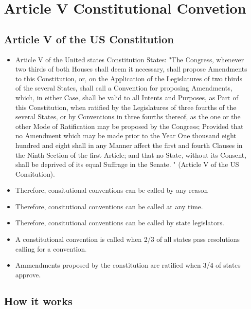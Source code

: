 \documentclass[11pt]{article} %
\begin{document}
\section{Article V Constitutional Convetion}

\subsection{Article V of the US Constitution}

\begin{itemize}

\item Article V of the United states Constitution States: "The Congress, whenever two thirds of both Houses shall deem it necessary, shall propose Amendments to this Constitution, or, on the Application of the Legislatures of two thirds of the several States, shall call a Convention for proposing Amendments, which, in either Case, shall be valid to all Intents and Purposes, as Part of this Constitution, when ratified by the Legislatures of three fourths of the several States, or by Conventions in three fourths thereof, as the one or the other Mode of Ratification may be proposed by the Congress; Provided that no Amendment which may be made prior to the Year One thousand eight hundred and eight shall in any Manner affect the first and fourth Clauses in the Ninth Section of the first Article; and that no State, without its Consent, shall be deprived of its equal Suffrage in the Senate. " (Article V of the US Consitution).

\item Therefore, consitutional conventions can be called by any reason

\item Therefore, consitutional conventions can be called at any time.

\item Therefore, consitutional conventions can be called by state legislators.

\item A constitutional convention is called when 2/3 of all states pass resolutions calling for a convention. 

\item Ammendments proposed by the constitution are ratified when 3/4 of states approve.

\end{itemize}

\subsection{How it works}
\end{document}
